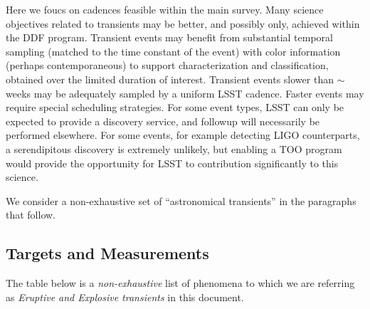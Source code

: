 Here we foucs on cadences feasible within the main survey.
Many science objectives related to transients may be better, and possibly only,
achieved within the DDF program.
Transient events may benefit from substantial temporal sampling
(matched to the time constant of the event) with color information
(perhaps contemporaneous) to support characterization and
classification, obtained over the limited duration of interest.
Transient events slower than $\sim$ weeks may be adequately sampled by
a uniform LSST cadence.  Faster events may require special scheduling
strategies.  For some event types, LSST can only be expected to
provide a discovery service, and followup will necessarily be
performed elsewhere.  For some events, for example detecting LIGO
counterparts, a serendipitous discovery is extremely unlikely, but
enabling a TOO program would provide the opportunity for LSST to
contribution significantly to this science.


We consider a non-exhaustive set of ``astronomical transients'' in the
paragraphs that follow.

\subsection{Targets and Measurements}
\label{sec:\chpname:targets}

The table below is a \emph{non-exhaustive} list of
phenomena to which we are referring as \emph{Eruptive and Explosive
  transients} in this document.

